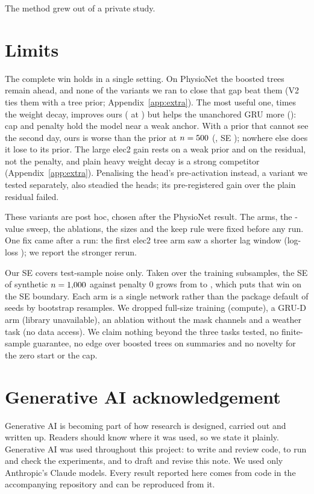 \documentclass{article}
\begin{document}
The method grew out of a private study. \nPrivateLine

\section{Limits}
\label{sec:limits}

The complete win holds in a single setting. On PhysioNet the boosted trees remain ahead, and none of the
\nVariantCount{} variants we ran to close that gap beat them (V2 ties them with a tree prior; Appendix~\ref{app:extra}). The most useful one,
\nWdMult{} times the weight decay, improves ours
(\nPhysWdMMOursLL{} at \nSizeMM) but helps the unanchored GRU more (\nPhysWdMMUnanchLL): cap and penalty hold the
model near a weak anchor. With a prior that cannot see the second day, ours is worse than the prior at
$n = 500$ (\nPhysStrongDDPrior, SE \nPhysStrongDSEPrior); nowhere else does it lose to its prior. The large
elec2 gain rests on a weak prior and on the residual, not the penalty, and plain heavy weight decay is a strong
competitor (Appendix~\ref{app:extra}). Penalising the head's pre-activation instead, a variant we tested separately,
also steadied the heads; its pre-registered gain over the plain residual failed.

These variants are post hoc, chosen after the PhysioNet result. The arms, the \nSweepCount-value sweep, the
\nAblationCount{} ablations, the sizes and the keep rule were fixed before any run. One fix came after a run: the
first elec2 tree arm saw a shorter lag window (log-loss \nElecOldGbmLL); we report the stronger rerun.

Our SE covers test-sample noise only. Taken over the \nSplitCount{} training subsamples, the SE of synthetic
$n = 1{,}000$ against penalty 0 grows from \nSynMSELzero{} to \nSynMSEsplitLzero, which puts that win on the
\nKeepSE{} SE boundary. Each arm is a single network rather than the package default of \nDefSeeds{} seeds by \nDefBags{}
bootstrap resamples. We dropped full-size training (compute), a GRU-D arm (library unavailable), an ablation without
the mask channels and a weather task (no data access). We claim nothing beyond the three tasks tested, no finite-sample
guarantee, no edge over boosted trees on summaries and no novelty for the zero start or the cap.

\section*{Generative AI acknowledgement}
Generative AI is becoming part of how research is designed, carried out and written up. Readers should know where
it was used, so we state it plainly. Generative AI was used throughout this project: to write and review code, to
run and check the experiments, and to draft and revise this note. We used only Anthropic's Claude models. Every
result reported here comes from code in the accompanying repository and can be reproduced from it.
\end{document}
